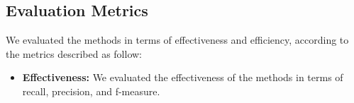 \subsection{Evaluation Metrics}

We evaluated the methods in terms of effectiveness and efficiency, according to the metrics described as follow:

\begin{itemize}
\item{\bf  Effectiveness:} We evaluated the effectiveness of the methods in terms of recall, precision, and f-measure. %

\begin{itemize}


\end{itemize}
\end{itemize}
